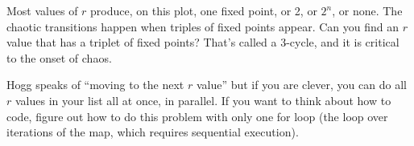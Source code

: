 \documentclass[12pt]{article}
\begin{document}
\begin{note}
  Most values of $r$ produce, on this plot, one fixed point, or 2, or $2^n$, or none.
  The chaotic transitions happen when triples of fixed points appear.
  Can you find an $r$ value that has a triplet of fixed points?
  That's called a 3-cycle, and it is critical to the onset of chaos.
\end{note}

\begin{note}
  Hogg speaks of ``moving to the next $r$ value'' but if you are clever,
  you can do all $r$ values in your list all at once, in parallel.
  If you want to think about how to code, figure out how to do this problem
  with only one for loop (the loop over iterations of the map, which requires
  sequential execution).
\end{note}
\end{document}

